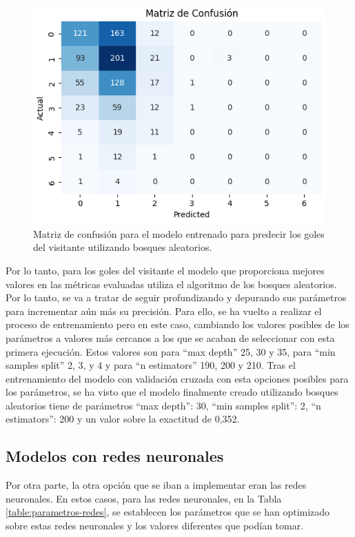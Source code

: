 \begin{figure}[H]
    \centering
    \includegraphics[scale=0.60]{svg/matriz-bosque-visitante.png}
    \caption{Matriz de confusión para el modelo entrenado para predecir los goles del visitante utilizando bosques aleatorios. }
    \label{fig:matriz-bosque-visitante}
\end{figure}


Por lo tanto, para los goles del visitante el modelo que proporciona mejores valores en las métricas evaluadas utiliza el algoritmo de los bosques aleatorios. Por lo tanto, se va a tratar de seguir profundizando y depurando sus parámetros para incrementar aún más su precisión. Para ello, se ha vuelto a realizar el proceso de entrenamiento pero en este caso, cambiando los valores posibles de los parámetros a valores más cercanos a los que se acaban de seleccionar con esta primera ejecución. Estos valores son para ``max depth'' 25, 30 y 35, para ``min samples split'' 2, 3, y 4 y para ``n estimators'' 190, 200 y 210. Tras el entrenamiento del modelo con validación cruzada con esta opciones posibles para los parámetros, se ha visto que el modelo finalmente creado utilizando bosques aleatorios tiene de parámetros ``max depth'': 30, ``min samples split'': 2, ``n estimators'': 200 y un valor sobre la exactitud de 0,352.





\subsection{Modelos con redes neuronales}
Por otra parte, la otra opción que se iban a implementar eran las redes neuronales. En estos casos, para las redes neuronales, en la Tabla \ref{table:parametros-redes}, se establecen los parámetros que se han optimizado sobre estas redes neuronales y los valores diferentes que podían tomar.

